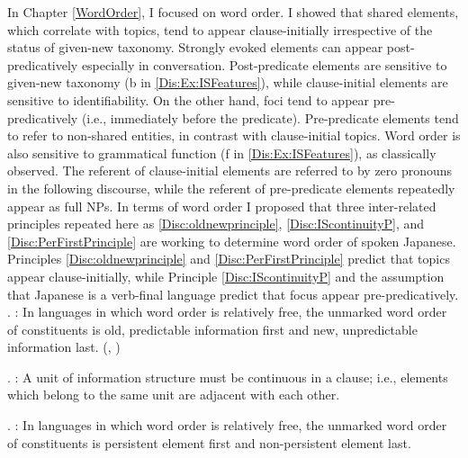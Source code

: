 In Chapter \ref{WordOrder},
I focused on word order.
I showed that shared elements, which correlate with topics, tend to appear clause-initially irrespective of the status of given-new taxonomy.
Strongly evoked elements can appear post-predicatively
especially in conversation.
Post-predicate elements are sensitive to given-new taxonomy (b in \ref{Dis:Ex:ISFeatures}),
while clause-initial elements are sensitive to identifiability.
On the other hand, foci tend to appear pre-predicatively
(i.e., immediately before the predicate).
Pre-predicate elements tend to refer to non-shared entities,
in contrast with clause-initial topics.
Word order is also sensitive to grammatical function (f in \ref{Dis:Ex:ISFeatures}),
as classically observed.
The referent of clause-initial elements are referred to by zero pronouns in the following discourse,
while the referent of pre-predicate elements repeatedly appear as full NPs.
In terms of word order
I proposed that three inter-related principles repeated here as \ref{Disc:oldnewprinciple}, \ref{Disc:IScontinuityP}, and \ref{Disc:PerFirstPrinciple} are working to determine word order of spoken Japanese.
Principles \ref{Disc:oldnewprinciple} and \ref{Disc:PerFirstPrinciple}
predict that topics appear clause-initially,
while Principle \ref{Disc:IScontinuityP} and the assumption that Japanese is a verb-final language predict that
focus appear pre-predicatively.
%
\ex. \label{Disc:oldnewprinciple}:
 In languages in which word order is relatively free,
 the unmarked word order of constituents is old,
 predictable information first and new, unpredictable information last.
 \hfill{(, )}

\ex. \label{Disc:IScontinuityP}:
 A unit of information structure must be continuous in a clause;
 i.e., elements which belong to the same unit are adjacent with each other.

\ex. \label{Disc:PerFirstPrinciple}:
 In languages in which word order is relatively free,
 the unmarked word order of constituents is persistent element first and non-persistent element last.

